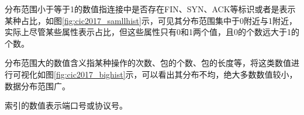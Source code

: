 分布范围小于等于1的数值指连接中是否存在FIN、SYN、ACK等标识或者是表示某种占比，如图\ref{fig:cic2017_samllhist}示，可见其分布范围集中于0附近与1附近，实际上尽管某些属性表示占比，但这些属性只有0和1两个值，且0的个数远大于1的个数。

分布范围大的数值含义指某种操作的次数、包的个数、包的长度等，将这类数值进行可视化如图\ref{fig:cic2017_bighist}示，可以看出其分布不均，绝大多数数值较小，数据分布范围广。

索引的数值表示端口号或协议号。

\begin{figure}[htbp] %
\centering %

\end{figure}
